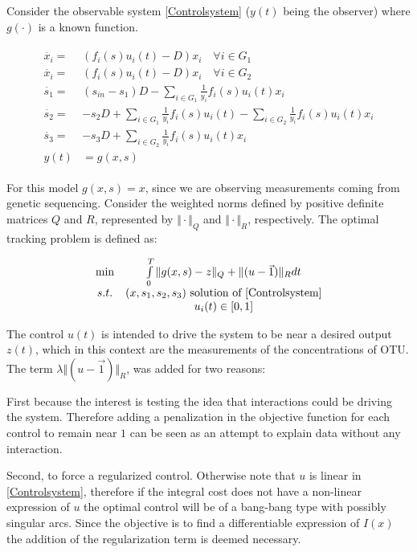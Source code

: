 \documentclass[3p,times]{elsarticle}
\begin{document}
Consider the observable system \eqref{Controlsystem} ($y(t)$ being the observer) where $g(\cdot)$ is a known function.

\begin{align} 
\label{Controlsystem}
\begin{array}{cl}
\dot{x_i} =& \left(f_i(s)u_i(t) -D \right)x_i \quad \forall i \in G_1\\
\dot{x_i} =& \left(f_i(s)u_i(t) -D \right)x_i \quad \forall i \in G_2\\
\dot{s_1} =& \displaystyle (s_{in}-s_1)D-\sum\limits_{i \in G_1}\frac{1}{y_i}f_i(s)u_i(t) x_i  \\
\dot{s_2} = & \displaystyle -s_2D+\sum\limits_{i \in G_1}\frac{1}{y_i}f_i(s)u_i(t)	-\sum\limits_{i \in G_2}\frac{1}{y_i}f_i(s)u_i(t) x_i  \\
\dot{s_3} =&  \displaystyle -s_3D+\sum\limits_{i \in G_2}\frac{1}{y_i}f_i(s)u_i(t) x_i \\
y(t) & = g(x,s)
\end{array}
\end{align}	

For this model $g(x,s) = x$, since we are observing measurements coming from genetic sequencing. Consider the weighted norms defined by positive definite matrices $Q$ and $R$, represented by $\Vert \cdot \Vert_Q$ and $\Vert \cdot \Vert_R$, respectively. The optimal tracking problem is defined as: 

\begin{align}
\label{Optimal Control} \begin{array}{cc} \min &  \int \limits_{0}^{T} \Vert g(x,s) - z \Vert_Q + \Vert(u -\vec{1}) \Vert_R dt\\
s.t.& 
(x,s_1,s_2,s_3)\mbox{ solution of \eqref{Controlsystem}} \\
&u_i(t) \in [0,1]
\end{array}	
\end{align} 

The control $u(t)$ is intended to drive the system to be near a desired output $z(t)$, which in this context are the measurements of the concentrations of OTU. The term $\lambda \Vert(u -\vec{1}) \Vert_R$, was added for two reasons:

First because the interest is testing the idea that interactions could be driving the system. Therefore adding a penalization in the objective function for each control to remain near $1$ can be seen as an attempt to explain data without any interaction.

Second, to force a regularized control. Otherwise note that $u$ is linear in \eqref{Controlsystem}, therefore if the integral cost does not have a non-linear expression of $u$ the optimal control will be of a bang-bang type with possibly singular arcs. Since the objective is to find a differentiable expression of $I(x)$ the addition of the regularization term is deemed necessary.
\end{document}

